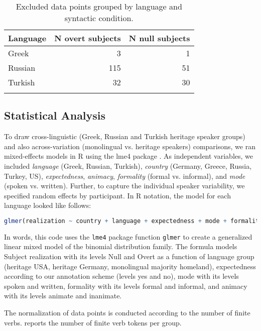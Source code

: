 \documentclass[output=paper,colorlinks,citecolor=brown]{langscibook}
\begin{document}
\begin{table}
\begin{tabular}{lrr}
  \lsptoprule
 Language & N overt subjects & N null subjects \\ 
  \midrule
  Greek & 3 & 1 \\ 
  Russian & 115 & 51 \\ 
  Turkish & 32 & 30 \\ 
  \lspbottomrule
\end{tabular}
\caption{Excluded data points grouped by language and syntactic condition.}
\label{tab:oezsoy:ProDrop:ExcludedTable}
\end{table}

\subsection{Statistical Analysis} \label{sec:oezsoy:Stats}
To draw cross-linguistic (Greek, Russian and Turkish heritage speaker groups) and also across-variation (monolingual vs. heritage speakers) comparisons, we ran mixed-effects models in R using the lme4 package \parencite{batesetal2015}. As independent variables, we included \textit{language} (Greek, Russian, Turkish), \textit{country} (Germany, Greece, Russia, Turkey, US), \textit{expectedness}, \textit{animacy}, \textit{formality} (formal vs. informal), and \textit{mode} (spoken vs. written). Further, to capture the individual speaker variability, we specified random effects by participant. In R notation, the model for each language looked like follows:
 
\begin{lstlisting}[language=R,keywordstyle=\ttfamily]
glmer(realization ~ country + language + expectedness + mode + formality + animacy + (1|participant), data = ProdropModel, family = binomial, control = glmerControl(calc.derivs=FALSE))
\end{lstlisting}

In words, this code uses the \texttt{lme4} package function \texttt{glmer} to create a generalized linear mixed model of the binomial distribution family. The formula models Subject realization with its levels Null and Overt as a function of language group (heritage USA, heritage Germany, monolingual majority homeland), expectedness according to our annotation scheme (levels yes and no), mode with its levels spoken and written, formality with its levels formal and informal, and animacy with its levels animate and inanimate. 

The normalization of data points is conducted according to the number of finite verbs. 
 reports the number of finite verb tokens per group.
\end{document}
